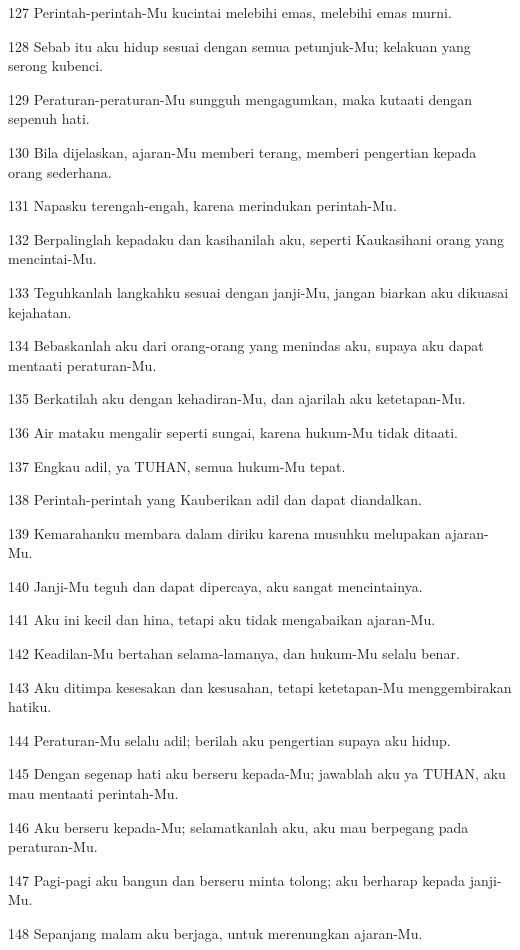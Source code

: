 \par 127 Perintah-perintah-Mu kucintai melebihi emas, melebihi emas murni.
\par 128 Sebab itu aku hidup sesuai dengan semua petunjuk-Mu; kelakuan yang serong kubenci.
\par 129 Peraturan-peraturan-Mu sungguh mengagumkan, maka kutaati dengan sepenuh hati.
\par 130 Bila dijelaskan, ajaran-Mu memberi terang, memberi pengertian kepada orang sederhana.
\par 131 Napasku terengah-engah, karena merindukan perintah-Mu.
\par 132 Berpalinglah kepadaku dan kasihanilah aku, seperti Kaukasihani orang yang mencintai-Mu.
\par 133 Teguhkanlah langkahku sesuai dengan janji-Mu, jangan biarkan aku dikuasai kejahatan.
\par 134 Bebaskanlah aku dari orang-orang yang menindas aku, supaya aku dapat mentaati peraturan-Mu.
\par 135 Berkatilah aku dengan kehadiran-Mu, dan ajarilah aku ketetapan-Mu.
\par 136 Air mataku mengalir seperti sungai, karena hukum-Mu tidak ditaati.
\par 137 Engkau adil, ya TUHAN, semua hukum-Mu tepat.
\par 138 Perintah-perintah yang Kauberikan adil dan dapat diandalkan.
\par 139 Kemarahanku membara dalam diriku karena musuhku melupakan ajaran-Mu.
\par 140 Janji-Mu teguh dan dapat dipercaya, aku sangat mencintainya.
\par 141 Aku ini kecil dan hina, tetapi aku tidak mengabaikan ajaran-Mu.
\par 142 Keadilan-Mu bertahan selama-lamanya, dan hukum-Mu selalu benar.
\par 143 Aku ditimpa kesesakan dan kesusahan, tetapi ketetapan-Mu menggembirakan hatiku.
\par 144 Peraturan-Mu selalu adil; berilah aku pengertian supaya aku hidup.
\par 145 Dengan segenap hati aku berseru kepada-Mu; jawablah aku ya TUHAN, aku mau mentaati perintah-Mu.
\par 146 Aku berseru kepada-Mu; selamatkanlah aku, aku mau berpegang pada peraturan-Mu.
\par 147 Pagi-pagi aku bangun dan berseru minta tolong; aku berharap kepada janji-Mu.
\par 148 Sepanjang malam aku berjaga, untuk merenungkan ajaran-Mu.
